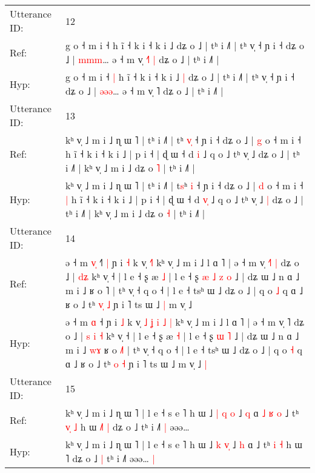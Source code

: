 \documentclass[10pt]{article}
\DeclareRobustCommand{\hl}[1]{{\textcolor{red}{#1}}}
\begin{document}
\begin{longtable}{ll}
 \\
\midrule
Utterance ID: & 12 \\
Ref: & g o ˧ m i ˧\hl{}\hl{} h ĩ ˧ k i ˧ k i ˩\hl{}\hl{} dʑ o ˩ | tʰ i ˩˥ | tʰ v̩ ˧ ɲ i ˧ dʑ o ˩ | \hl{m}\hl{m}\hl{m}… ə ˧ m v̩ \hl{˧}˥\hl{ }\hl{|} dʑ o ˩ | tʰ i ˩˥ |
 \\
Hyp: & g o ˧ m i ˧\hl{ }\hl{|} h ĩ ˧ k i ˧ k i ˩\hl{ }\hl{|} dʑ o ˩ | tʰ i ˩˥ | tʰ v̩ ˧ ɲ i ˧ dʑ o ˩ | \hl{ə}\hl{ə}\hl{ə}… ə ˧ m v̩ \hl{}˥\hl{}\hl{} dʑ o ˩ | tʰ i ˩˥ |
 \\
\midrule
Utterance ID: & 13 \\
Ref: & kʰ v̩ ˩ m i ˩ ɳ ɯ ˥ | tʰ i ˩˥ | t\hl{}ʰ \hl{v}\hl{̩} ˧ ɲ i ˧ dʑ o ˩ | \hl{g} o ˧ m i ˧\hl{}\hl{} h ĩ ˧ k i ˧ k i ˩ | p i ˧ | ɖ ɯ ˧ d \hl{}\hl{i} ˩ q o ˩ tʰ v̩ ˩\hl{}\hl{} dʑ o ˩ | tʰ i ˩˥ | kʰ v̩ ˩ m i ˩ dʑ o \hl{˥} | tʰ i ˩˥ |
 \\
Hyp: & kʰ v̩ ˩ m i ˩ ɳ ɯ ˥ | tʰ i ˩˥ | t\hl{s}ʰ \hl{}\hl{i} ˧ ɲ i ˧ dʑ o ˩ | \hl{d} o ˧ m i ˧\hl{ }\hl{|} h ĩ ˧ k i ˧ k i ˩ | p i ˧ | ɖ ɯ ˧ d \hl{v}\hl{̩} ˩ q o ˩ tʰ v̩ ˩\hl{ }\hl{|} dʑ o ˩ | tʰ i ˩˥ | kʰ v̩ ˩ m i ˩ dʑ o \hl{˧} | tʰ i ˩˥ |
 \\
\midrule
Utterance ID: & 14 \\
Ref: & ə ˧ m \hl{v}\hl{̩} ˧\hl{˥}\hl{ }\hl{|} ɲ i \hl{˧} k v̩\hl{}\hl{}\hl{}\hl{}\hl{}\hl{} \hl{}\hl{˧}\hl{˥} kʰ v̩ ˩ m i ˩ l ɑ ˥ | ə ˧ m v̩ \hl{˧}˥\hl{ }\hl{|} dʑ o ˩ |\hl{}\hl{} \hl{}\hl{d}\hl{ʑ} kʰ v̩ ˧ | l e ˧ ʂ æ \hl{˩} | l e ˧ ʂ\hl{ }\hl{æ}\hl{ }\hl{˩} \hl{z} \hl{o} ˩ | dʑ ɯ ˩ n ɑ ˩ m i ˩\hl{}\hl{}\hl{} ʁ o \hl{}˥ | tʰ v̩ ˧ q o ˧ | l e ˧ tsʰ ɯ ˩ dʑ o ˩ | q o \hl{˩} q ɑ ˩ ʁ o ˩ tʰ \hl{v}\hl{̩} \hl{˩} ɲ i ˥ ts ɯ ˩\hl{ }\hl{|} m v̩ ˩\hl{}\hl{}
 \\
Hyp: & ə ˧ m \hl{}\hl{ɑ} ˧\hl{}\hl{}\hl{} ɲ i \hl{˩} k v̩\hl{ }\hl{˩}\hl{ }\hl{ʝ}\hl{ }\hl{i} \hl{˩}\hl{ }\hl{|} kʰ v̩ ˩ m i ˩ l ɑ ˥ | ə ˧ m v̩ \hl{}˥\hl{}\hl{} dʑ o ˩ |\hl{ }\hl{s} \hl{i}\hl{ }\hl{˧} kʰ v̩ ˧ | l e ˧ ʂ æ \hl{˧} | l e ˧ ʂ\hl{}\hl{}\hl{}\hl{} \hl{ɯ} \hl{˥} ˩ | dʑ ɯ ˩ n ɑ ˩ m i ˩\hl{ }\hl{w}\hl{ɤ} ʁ o \hl{˩}˥ | tʰ v̩ ˧ q o ˧ | l e ˧ tsʰ ɯ ˩ dʑ o ˩ | q o \hl{˧} q ɑ ˩ ʁ o ˩ tʰ \hl{}\hl{o} \hl{˧} ɲ i ˥ ts ɯ ˩\hl{}\hl{} m v̩ ˩\hl{ }\hl{|}
 \\
\midrule
Utterance ID: & 15 \\
Ref: & kʰ v̩ ˩ m i ˩ ɳ ɯ ˥ | l e ˧ s e ˥ h ɯ ˩ \hl{|} \hl{q}\hl{ }\hl{o} ˩ \hl{q} ɑ\hl{ }\hl{˩}\hl{ }\hl{ʁ}\hl{ }\hl{o} ˩ tʰ \hl{v}\hl{̩} \hl{˩} h ɯ \hl{˩}˥\hl{ }\hl{|} dʑ o ˩\hl{}\hl{} tʰ i ˩˥\hl{ }\hl{|} əəə…\hl{}\hl{}
 \\
Hyp: & kʰ v̩ ˩ m i ˩ ɳ ɯ ˥ | l e ˧ s e ˥ h ɯ ˩ \hl{k} \hl{}\hl{v}\hl{̩} ˩ \hl{h} ɑ\hl{}\hl{}\hl{}\hl{}\hl{}\hl{} ˩ tʰ \hl{}\hl{i} \hl{˧} h ɯ \hl{}˥\hl{}\hl{} dʑ o ˩\hl{ }\hl{|} tʰ i ˩˥\hl{}\hl{} əəə…\hl{ }\hl{|}

\end{longtable}
\end{document}
